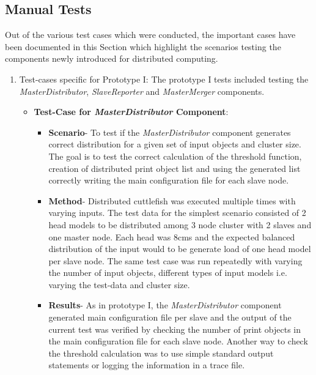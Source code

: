 \subsection{Manual Tests} \label{ManualTests}

Out of the various test cases which were conducted, the important cases have been documented in this Section which highlight the scenarios testing the components newly introduced for distributed computing. 

\begin{enumerate}
\item{Test-cases specific for Prototype I}: The prototype I tests included testing the \textit{MasterDistributor}, \textit{SlaveReporter} and \textit{MasterMerger} components. 
\begin{itemize}
\item{\textbf{Test-Case for \textit{MasterDistributor} Component}}:

\begin{itemize}
\item{\textbf{Scenario}}- To test if the \textit{MasterDistributor} component generates correct distribution for a given set of input objects and cluster size. The goal is to test the correct calculation of the threshold function, creation of distributed print object list and using the generated list correctly writing the main configuration file for each slave node.  
\item{\textbf{Method}}- Distributed cuttlefish was executed multiple times with varying inputs. The test data for the simplest scenario consisted of 2 head models to be distributed among 3 node cluster with 2 slaves and one master node. Each head was 8cms and the expected balanced distribution of the input would to be generate load of one head model per slave node. The same test case was run repeatedly with varying the number of input objects, different types of input models i.e. varying the test-data and cluster size. 
\item{\textbf{Results}}- As in prototype I, the \textit{MasterDistributor} component generated main configuration file per slave and the output of the current test was verified by checking the number of print objects in the main configuration file for each slave node. Another way to check the threshold calculation was to use simple standard output statements or logging the information in a trace file.
\end{itemize}


\end{itemize}
\end{enumerate}
